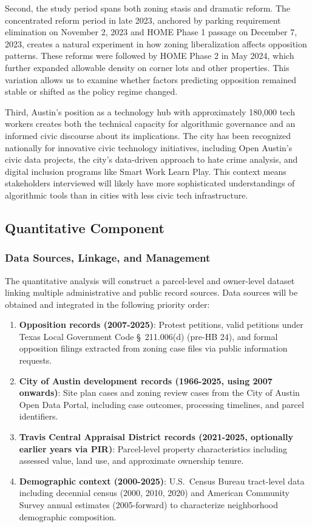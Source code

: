 \documentclass[12pt]{article}
\begin{document}
Second, the study period spans both zoning stasis and dramatic reform. The concentrated reform period in late 2023, anchored by parking requirement elimination on November 2, 2023 and HOME Phase 1 passage on December 7, 2023, creates a natural experiment in how zoning liberalization affects opposition patterns. These reforms were followed by HOME Phase 2 in May 2024, which further expanded allowable density on corner lots and other properties. This variation allows us to examine whether factors predicting opposition remained stable or shifted as the policy regime changed.

Third, Austin's position as a technology hub with approximately 180,000 tech workers creates both the technical capacity for algorithmic governance and an informed civic discourse about its implications. The city has been recognized nationally for innovative civic technology initiatives, including Open Austin's civic data projects, the city's data-driven approach to hate crime analysis, and digital inclusion programs like Smart Work Learn Play. This context means stakeholders interviewed will likely have more sophisticated understandings of algorithmic tools than in cities with less civic tech infrastructure.

\subsection{Quantitative Component}

\subsubsection*{Data Sources, Linkage, and Management}

The quantitative analysis will construct a parcel-level and owner-level dataset linking multiple administrative and public record sources. Data sources will be obtained and integrated in the following priority order:

\begin{enumerate}
\item \textbf{Opposition records (2007-2025)}: Protest petitions, valid petitions under Texas Local Government Code \S\ 211.006(d) (pre-HB 24), and formal opposition filings extracted from zoning case files via public information requests.
\item \textbf{City of Austin development records (1966-2025, using 2007 onwards)}: Site plan cases and zoning review cases from the City of Austin Open Data Portal, including case outcomes, processing timelines, and parcel identifiers.
\item \textbf{Travis Central Appraisal District records (2021-2025, optionally earlier years via PIR)}: Parcel-level property characteristics including assessed value, land use, and approximate ownership tenure.
\item \textbf{Demographic context (2000-2025)}: U.S.\ Census Bureau tract-level data including decennial census (2000, 2010, 2020) and American Community Survey annual estimates (2005-forward) to characterize neighborhood demographic composition.
\end{enumerate}
\end{document}
